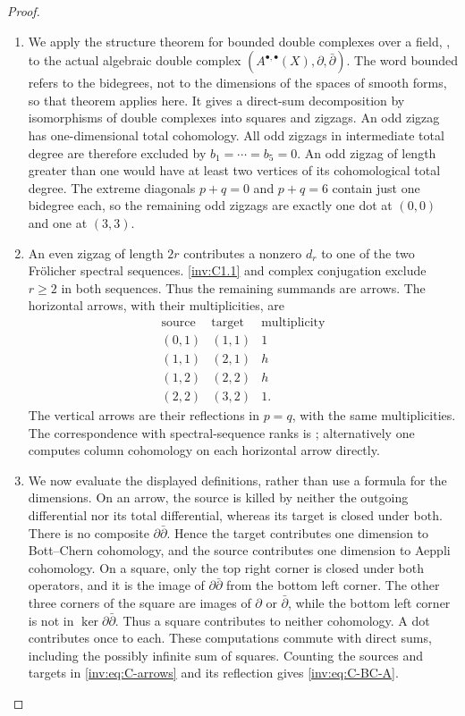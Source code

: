 \begin{proof}
\begin{enumerate}[label=\arabic*.,leftmargin=*]
\item We apply the structure theorem for bounded double complexes over a
field, \citet[Theorem 3]{Stelzig2021}, to the actual algebraic double
complex $(A^{\bullet,\bullet}(X),\partial,\bar\partial)$.
The word bounded refers to the bidegrees, not to the dimensions of the
spaces of smooth forms, so that theorem applies here.  It gives a
direct-sum decomposition by isomorphisms of double complexes into
squares and zigzags.  An odd zigzag has one-dimensional total
cohomology.  All odd zigzags in intermediate total degree are therefore
excluded by $b_1=\cdots=b_5=0$.  An odd zigzag of length greater than
one would have at least two vertices of its cohomological total degree.
The extreme diagonals $p+q=0$ and $p+q=6$ contain just one bidegree
each, so the remaining odd zigzags are exactly one dot at $(0,0)$ and
one at $(3,3)$.

\item An even zigzag of length $2r$ contributes a nonzero $d_r$ to one of
the two Fr\"olicher spectral sequences.  \ref{inv:C1.1} and complex conjugation
exclude $r\ge2$ in both sequences.  Thus the remaining summands are
arrows.  The horizontal arrows, with their multiplicities, are
\begin{equation}\label{inv:eq:C-arrows}
\begin{array}{c|c|r}
\text{source}&\text{target}&\text{multiplicity}\\\hline
(0,1)&(1,1)&1\\
(1,1)&(2,1)&h\\
(1,2)&(2,2)&h\\
(2,2)&(3,2)&1.
\end{array}
\end{equation}
The vertical arrows are their reflections in $p=q$, with the same
multiplicities.  The correspondence with spectral-sequence ranks is
\citet[Proposition 6(1)]{Stelzig2021}; alternatively one computes
column cohomology on each horizontal arrow directly.

\item We now evaluate the displayed definitions, rather than use a formula
for the dimensions.  On an arrow, the source is killed by neither
the outgoing differential nor its total differential, whereas its
target is closed under both.  There is no composite
$\partial\bar\partial$.  Hence the target contributes one dimension
to Bott--Chern cohomology, and the source contributes one dimension
to Aeppli cohomology.  On a square, only the top right corner is closed
under both operators, and it is the image of
$\partial\bar\partial$ from the bottom left corner.  The other
three corners of the square are images of $\partial$ or
$\bar\partial$, while the bottom left corner is not in
$\ker\partial\bar\partial$.  Thus a square contributes to neither
cohomology.  A dot contributes once to each.  These computations
commute with direct sums, including the possibly infinite sum of
squares.  Counting the sources and targets in \eqref{inv:eq:C-arrows}
and its reflection gives \eqref{inv:eq:C-BC-A}.


\end{enumerate}
\end{proof}
